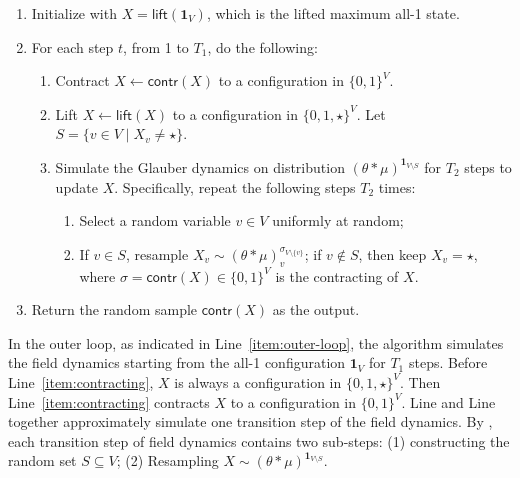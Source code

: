 \documentclass[11pt,a4paper]{article}
\theoremstyle{definition}
\def\*#1{\mathbf{#1}} %
\def\+#1{\mathcal{#1}} %
\begin{document}
 \begin{tcolorbox}[colback=lightgray!20, colframe=lightgray!18, coltitle=black, title={\underline{Simulation Algorithm for Field Dynamics} $\+A_\mu(\theta,T_1,T_2)$}]
   \begin{enumerate}
        \item  Initialize with $X = \textsf{lift}(\*1_V)$, which is the lifted maximum all-1 state.
        \item \label{item:outer-loop} For each step $t$, from 1 to $T_1$, do the following:
       \begin{enumerate}
            \item \label{item:contracting} Contract $X \gets \textsf{contr}(X)$ to a configuration in $\{0,1\}^V$.
           \item \label{item:lifting} Lift $X \gets \textsf{lift}(X)$ to a configuration in $\{0,1,\star\}^V$. Let $S = \{v \in V \mid X_v \neq \star\}$.
            \item \label{item:inner-loop} Simulate the Glauber dynamics on distribution $(\theta *\mu)^{\*1_{V \setminus S}}$ for $T_2$ steps to update $X$. Specifically, repeat the following steps $T_2$ times:
            \begin{enumerate}
                \item \label{item:random-variable} Select a random variable $v \in V$ uniformly at random;
                \item \label{item:resample} If $v \in S$, resample $X_v \sim (\theta *\mu)^{\sigma_{V \setminus \{v\}}}_v$; if $v \notin S$, then keep $X_v = \star$, where $\sigma = \textsf{contr}(X)\in \{0,1\}^V$ is the contracting of $X$. 
            \end{enumerate}
        \end{enumerate}
        \item Return the random sample $\textsf{contr}(X)$ as the output.
    \end{enumerate}
\end{tcolorbox}

In the outer loop, as indicated in Line~\ref{item:outer-loop}, the algorithm simulates  the field dynamics starting from the all-1 configuration $\*1_V$ for $T_1$ steps.
Before Line~\ref{item:contracting}, $X$ is always a configuration in $\{0,1,\star\}^V$.
Then Line~\ref{item:contracting} contracts $X$ to a configuration in $\{0,1\}^V$.
Line  and Line  together approximately simulate one transition step of the field dynamics.
By , each transition step of field dynamics contains two sub-steps: (1) constructing the random set $S \subseteq V$; (2) Resampling $X \sim (\theta * \mu)^{\*1_{V \setminus S}}$.
\end{document}
